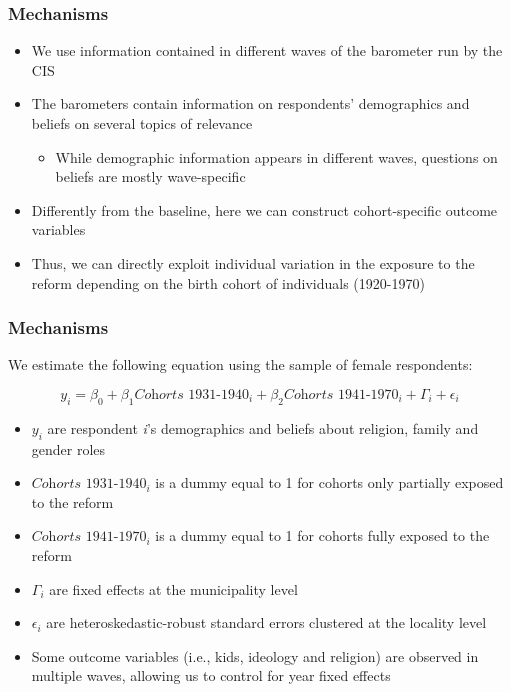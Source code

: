 \documentclass[aspectratio=169]{beamer}
\begin{document}
\begin{frame}
\frametitle{Mechanisms}
\begin{itemize}
    \item We use information contained in different waves of the barometer run by the CIS
    \medskip \pause
    \item The barometers contain information on respondents' demographics and beliefs on several topics of relevance 
    \medskip 
    \begin{itemize}
        \item While demographic information appears in different waves, questions on beliefs are mostly wave-specific
    \end{itemize}

    \medskip\pause
    \item Differently from the baseline, here we can construct cohort-specific outcome variables

    \medskip
    \item Thus, we can directly exploit individual variation in the exposure to the reform depending on the birth cohort of individuals (1920-1970)

\end{itemize}
\end{frame}


\begin{frame}
\frametitle{Mechanisms}

We estimate the following equation using the sample of  female respondents:

\begin{equation}\label{main_eq}
y_{i} =\beta_0+  \beta_1  \textit{Cohorts 1931-1940}_i + \beta_2 \textit{Cohorts 1941-1970}_i+\Gamma_i +\epsilon_{i}
\end{equation}
\smallskip\pause
\begin{itemize}
    \item $y_i$ are respondent \textit{i}'s  demographics and beliefs about religion, family and gender roles
    \medskip\pause
    \item $\textit{Cohorts 1931-1940}_i$ is a dummy equal to 1 for cohorts only partially exposed to the reform 
    \medskip
    \item  $\textit{Cohorts 1941-1970}_i$ is a dummy equal to 1 for cohorts fully exposed to the reform
    \medskip\pause
    \item $\Gamma_i$ are fixed effects at the municipality level
    \medskip\pause
    \item $\epsilon_i$ are heteroskedastic-robust standard errors clustered at the locality level
    \medskip\pause
    \item Some outcome variables (i.e., kids, ideology and religion) are observed in multiple waves, allowing us to control for year fixed effects
\end{itemize}


\end{frame}
\end{document}
